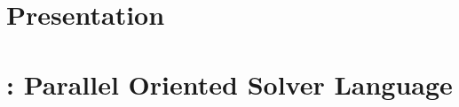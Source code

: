 \documentclass[a4paper,11pt,twoside,parskip=half,numbers=noenddot,bibliography=totocnumbered,listof = totoc]{scrbook}
\begin{document}

\frontmatter
%

\cleardoublepage
%

\cleardoublepage
\dominitoc
\tableofcontents
%
%
%

\mainmatter

\part{Presentation}
%
%
%
\part{\posl{}: Parallel Oriented Solver Language}

%
%
%
%

\footnotesize
{} %

\normalsize


%
%
%
%
%
%
\end{document}
